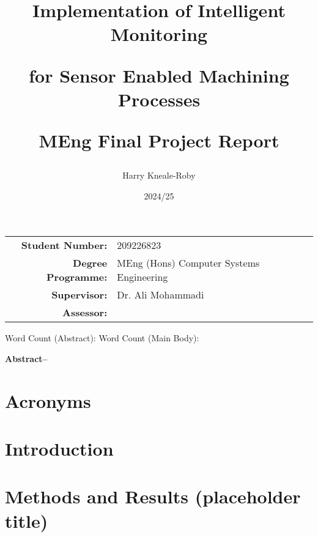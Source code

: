 \documentclass{article}
\title{   
    Implementation of Intelligent Monitoring
    
    for Sensor Enabled Machining Processes

    \vspace{10px}
    MEng Final Project Report    
}
\author{Harry Kneale-Roby}
\date{2024/25}
\begin{document}
\maketitle

\begin{table}[!ht]
    \centering
    \begin{tabular}{rl}
        \textbf{Student Number:} & 209226823 \\
        \textbf{Degree Programme:} & MEng (Hons) Computer Systems Engineering\\
        \textbf{Supervisor:} & Dr. Ali Mohammadi\\
        \textbf{Assessor:} & 
    \end{tabular}
\end{table}

\begin{center}
    Word Count (Abstract): \linebreak
    Word Count (Main Body): 
\end{center}


\addtocounter{page}{-1}
\thispagestyle{empty} 
\pagebreak

\textbf{Abstract--}

\tableofcontents

\pagebreak

\section{Acronyms}

\pagebreak

\twocolumn

\section{Introduction}


\section{Methods and Results (placeholder title)}

\end{document}
